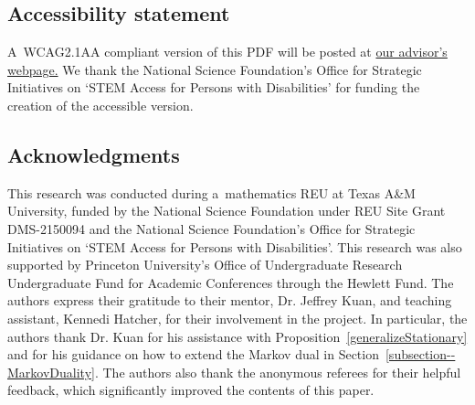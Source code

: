 \documentclass[pdftex]{sigma}
\numberwithin{equation}{section}
\theoremstyle{definition}
\begin{document}
\vspace{-1mm}

\subsection*{Accessibility statement}
  A~WCAG2.1AA compliant version of this PDF will be posted at \href{https://u.osu.edu/jkuanpapers/2026/01/23/reu_2024_paper/}{our advisor's webpage.} We thank the National Science
Foundation's Office for Strategic Initiatives on `STEM Access for Persons with Disabilities' for funding the creation of the accessible version.


\subsection*{Acknowledgments}
This research was conducted during a~mathematics REU at Texas A\&M University, funded by the National Science Foundation under REU Site Grant DMS-2150094 and the National Science Foundation's Office for Strategic Initiatives on `STEM Access for Persons with Disabilities'. This research was also supported by Princeton University's Office of Undergraduate Research Undergraduate Fund for Academic Conferences through the Hewlett Fund. The authors express their gratitude to their mentor, Dr. Jeffrey Kuan, and teaching assistant, Kennedi Hatcher, for their involvement in the project. In particular, the authors thank Dr. Kuan for his assistance with Proposition~\ref{generalizeStationary} and for his guidance on how to extend the Markov dual in Section~\ref{subsection--MarkovDuality}. The authors also thank the anonymous referees for their helpful feedback, which significantly improved the contents of this paper.
\end{document}
